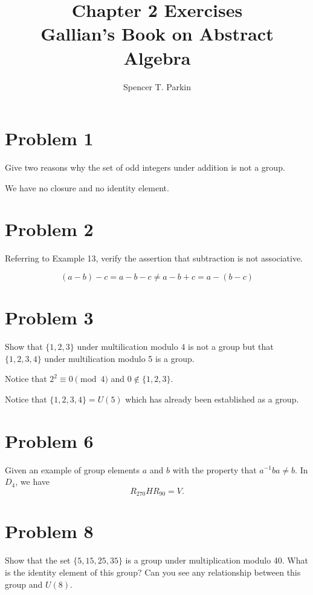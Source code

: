 \documentclass[12pt]{article}
\title{Chapter 2 Exercises\\Gallian's Book on Abstract Algebra}
\author{Spencer T. Parkin}
\begin{document}
\maketitle

\section*{Problem 1}

Give two reasons why the set of odd integers under addition is not a group.

We have no closure and no identity element.

\section*{Problem 2}

Referring to Example 13, verify the assertion that subtraction is not associative.

\begin{equation*}
(a-b)-c = a-b-c \neq a-b+c = a-(b-c)
\end{equation*}

\section*{Problem 3}

Show that $\{1,2,3\}$ under multilication modulo 4 is not a group but that
$\{1,2,3,4\}$ under multilication modulo 5 is a group.

Notice that $2^2\equiv 0\pmod{4}$ and $0\not\in\{1,2,3\}$.

Notice that $\{1,2,3,4\}=U(5)$ which has already been established as a group.

\section*{Problem 6}

Given an example of group elements $a$ and $b$ with the property that
$a^{-1}ba\neq b$.
In $D_4$, we have
\begin{equation*}
R_{270}HR_{90} = V.
\end{equation*}

\section*{Problem 8}

Show that the set $\{5,15,25,35\}$ is a group under multiplication modulo 40.
What is the identity element of this group?  Can you see any relationship
between this group and $U(8)$.
\end{document}
